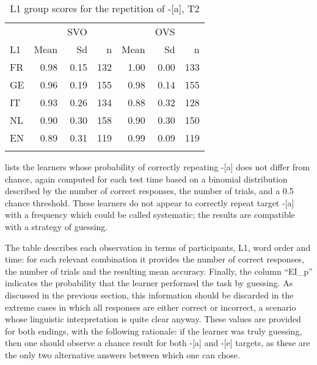 \begin{table}[t]
    \begin{tabularx}{.66\textwidth}{Xrrr@{\hspace{1cm}}rrr}
    \lsptoprule
    &  & {SVO} && & {OVS} &\\
    L1 & Mean & Sd & n & Mean & Sd & n\\
    \midrule
    FR & 0.98 & 0.15 & 132 & 1.00 & 0.00 & 133\\
    GE & 0.96 & 0.19 & 155 & 0.98 & 0.14 & 155\\
    IT & 0.93 & 0.26 & 134 & 0.88 & 0.32 & 128\\
    NL & 0.90 & 0.30 & 158 & 0.90 & 0.30 & 150\\
    EN & 0.89 & 0.31 & 119 & 0.99 & 0.09 & 119\\
    \lspbottomrule
    \end{tabularx}
    \caption{L1 group scores for the repetition of -[a], T2}
    \label{tab:04:8}
\end{table}

 lists the learners whose probability of correctly repeating -[a] does not differ from chance, again computed for each test time based on a binomial distribution described by the number of correct responses, the number of trials, and a 0.5 chance threshold. These learners do not appear to correctly repeat target -[a] with a frequency which could be called systematic; the results are compatible with a strategy of guessing.

The table describes each observation in terms of participants, L1, word order and time: for each relevant combination it provides the number of correct responses, the number of trials and the resulting mean accuracy. Finally, the column “EI\_p” indicates the probability that the learner performed the task by guessing. As discussed in the previous section, this information should be discarded in the extreme cases in which all responses are either correct or incorrect, a scenario whose linguistic interpretation is quite clear anyway. These values are provided for both endings, with the following rationale: if the learner was truly guessing, then one should observe a chance result for both -[a] and -[e] targets, as these are the only two alternative answers between which one can chose.

